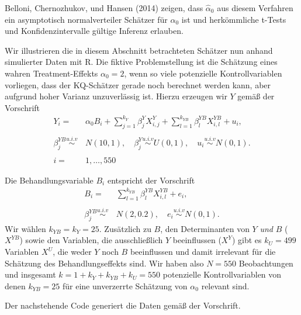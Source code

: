 \documentclass[
  a4paper,
  DIV=11,
  oneside]{scrreprt}
\begin{document}
Belloni, Chernozhukov, und Hansen (2014) zeigen, dass
\(\widehat{\alpha}_0\) aus diesem Verfahren ein asymptotisch
normalverteiler Schätzer für \(\alpha_0\) ist und herkömmliche t-Tests
und Konfidenzintervalle gültige Inferenz erlauben.

Wir illustrieren die in diesem Abschnitt betrachteten Schätzer nun
anhand simulierter Daten mit R. Die fiktive Problemstellung ist die
Schätzung eines wahren Treatment-Effekts \(\alpha_0 = 2\), wenn so viele
potenzielle Kontrollvariablen vorliegen, dass der KQ-Schätzer gerade
noch berechnet werden kann, aber aufgrund hoher Varianz unzuverlässig
ist. Hierzu erzeugen wir \(Y\) gemäß der Vorschrift \begin{align*}
  Y_i =&\, \alpha_0 B_i + \sum_{j=1}^{k_Y} \beta_{j}^Y X_{i,j}^Y + \sum_{l=1}^{k_{YB}} \beta_{l}^{YB} X_{i,l}^{YB} + u_i,\\
  \\
  \beta_j^{YB} \overset{u.i.v}{\sim}&\,N(10,1), \quad \beta_j^{Y} \overset{u.i.v}{\sim}U(0,1), \quad u_i \overset{u.i.v}{\sim}N(0,1).\\
  \\
  i=&\,1,\dots,550
\end{align*}

Die Behandlungsvariable \(B_i\) entspricht der Vorschrift \begin{align*}
  B_i =&\, \sum_{l=1}^{k_{YB}} \beta_{l}^{YB} X_{i,l}^{YB} + e_i,\\
  \\
  \beta_j^{YB} \overset{u.i.v}{\sim}&\,N(2,0.2), \quad e_i \overset{u.i.v}{\sim}N(0,1).
\end{align*} Wir wählen \(k_{YB} = k_{Y} = 25\). Zusätzlich zu \(B\),
den Determinanten von \(Y\) \emph{und} \(B\) (\(X^{YB}\)) sowie den
Variablen, die ausschließlich \(Y\) beeinflussen (\(X^{Y}\)) gibt es
\(k_U = 499\) Variablen \(X^U\), die weder \(Y\) noch \(B\) beeinflussen
und damit irrelevant für die Schätzung des Behandlungseffekts sind. Wir
haben also \(N=550\) Beobachtungen und insgesamt
\(k = 1+k_{Y} + k_{YB} + k_{U} = 550\) potenzielle Kontrollvariablen von
denen \(k_{YB} = 25\) für eine unverzerrte Schätzung von \(\alpha_0\)
relevant sind.

Der nachstehende Code generiert die Daten gemäß der Vorschrift.
\end{document}
